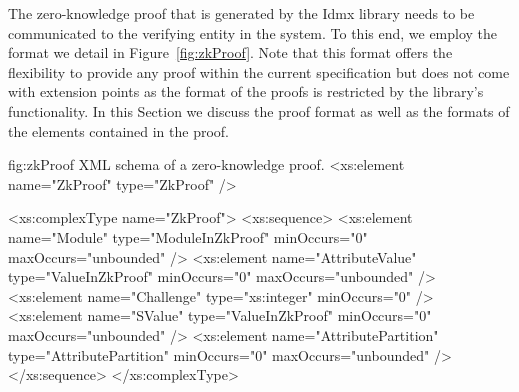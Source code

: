 % 
% 

The zero-knowledge proof that is generated by the Idmx library needs to be communicated to the 
verifying entity in the system. 
To this end, we employ the format we detail in Figure~\ref{fig:zkProof}.
Note that this format offers the flexibility to provide any proof within the current specification 
but does not come with extension points as the format of the proofs is restricted by the library's 
functionality.
In this Section we discuss the proof format as well as the formats of the elements contained in 
the proof.

\begin{xml}
{fig:zkProof}
{XML schema of a zero-knowledge proof.}
<xs:element name="ZkProof" type="ZkProof" />

<xs:complexType name="ZkProof">
  <xs:sequence>
    <xs:element name="Module" type="ModuleInZkProof" minOccurs="0" 
      maxOccurs="unbounded" />
    <xs:element name="AttributeValue" type="ValueInZkProof" minOccurs="0" 
      maxOccurs="unbounded" />
    <xs:element name="Challenge" type="xs:integer" minOccurs="0" />
    <xs:element name="SValue" type="ValueInZkProof" minOccurs="0" 
      maxOccurs="unbounded" />
    <xs:element name="AttributePartition" type="AttributePartition" 
      minOccurs="0" maxOccurs="unbounded" />
  </xs:sequence>
</xs:complexType>
\end{xml}


